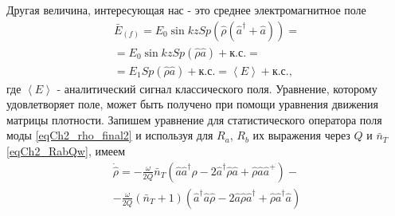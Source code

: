 Другая величина, интересующая нас - это среднее электромагнитное поле
\begin{eqnarray}
\bar{E}_{(f)} = E_0 \sin k z
Sp\left(\hat{\rho}\left(\hat{a}^{\dag} + \hat{a}\right)\right) = 
\nonumber \\
= E_0 \sin k z Sp\left(\hat{\rho}\hat{a}\right) + \mbox{к.с.} = 
\nonumber \\
= E_1 Sp\left(\hat{\rho}\hat{a}\right) + \mbox{к.с.} =
\left<E\right> + \mbox{к.с.}, 
\nonumber
\end{eqnarray}
где $\left<E\right>$ - аналитический сигнал классического
поля. 
Уравнение, которому удовлетворяет поле, может быть получено при
помощи уравнения движения матрицы плотности. Запишем уравнение для
статистического оператора поля моды  
\eqref{eqCh2_rho_final2} и
используя для $R_a$, $R_b$ их выражения через $Q$ и $\bar{n}_T$
  \eqref{eqCh2_RabQw}, имеем
\begin{eqnarray}
\dot{\hat{\rho}} =
- \frac{\omega}{2Q}\bar{n}_T
\left(\hat{a}\hat{a}^{\dag}\hat{\rho} - 
2 \hat{a}^{\dag}\hat{\rho}\hat{a} + \hat{\rho}\hat{a}\hat{a}^{+}
\right)
- 
\nonumber \\
- \frac{\omega}{2Q}\left(\bar{n}_T + 1\right)
\left(\hat{a}^{\dag}\hat{a}\hat{\rho} - 
2 \hat{a}\hat{\rho}\hat{a}^{\dag}
+ \hat{\rho}\hat{a}^{\dag}\hat{a}
\right)
\label{eqCh2_eq1_add1}
\end{eqnarray}

